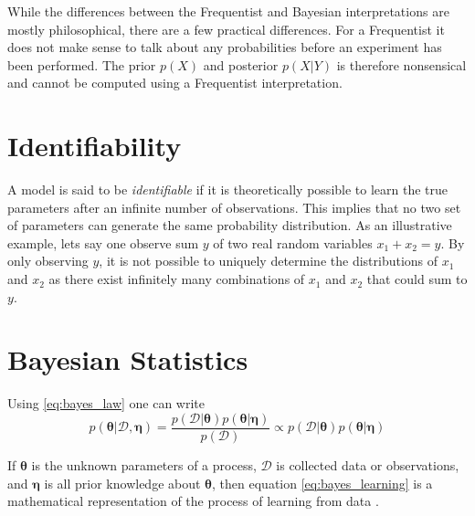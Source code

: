 While the differences between the Frequentist and Bayesian interpretations are mostly philosophical, there are a few practical differences. For a Frequentist it does not make sense to talk about any probabilities before an experiment has been performed. The prior $p(X)$ and posterior $p(X | Y)$ is therefore nonsensical and cannot be computed using a Frequentist interpretation.



\section{Identifiability}
A model is said to be \textit{identifiable} if it is theoretically possible to learn the true parameters after an infinite number of observations. This implies that no two set of parameters can generate the same probability distribution. As an illustrative example, lets say one observe sum $y$ of two real random variables $x_1 + x_2 = y$. By only observing $y$, it is not possible to uniquely determine the distributions of $x_1$ and $x_2$ as there exist infinitely many combinations of $x_1$ and $x_2$ that could sum to $y$. 


\section{Bayesian Statistics}

Using \cref{eq:bayes_law} one can write 
\begin{equation}\label{eq:bayes_learning}
    p(\boldsymbol{\theta}| \mathcal{D}, \boldsymbol{\eta}) = \frac{p(\mathcal{D} | \boldsymbol{\theta}) p(\boldsymbol{\theta} | \boldsymbol{\eta})}{p(\mathcal{D})} \propto p(\mathcal{D} | \boldsymbol{\theta})p(\boldsymbol{\theta} | \boldsymbol{\eta})
\end{equation}

If $\boldsymbol{\theta}$ is the unknown parameters of a process, $\mathcal{D}$ is collected data or observations, and $\boldsymbol{\eta}$ is all prior knowledge about $\boldsymbol{\theta}$, then equation \eqref{eq:bayes_learning} is a mathematical representation of the process of learning from data \cite{Jaynes86bayesianmethods:}.

